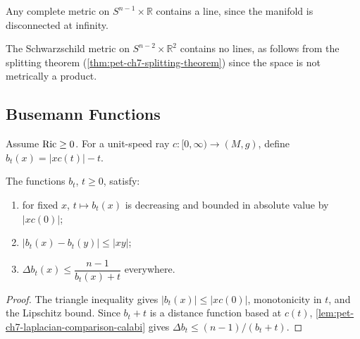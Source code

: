 \begin{example}
  \label{ex:pet-ch7-cylinder-contains-line}

  Any complete metric on $S^{n-1}\times\mathbb{R}$ contains a line, since the
  manifold is disconnected at infinity.
\end{example}

\begin{example}
  \label{ex:pet-ch7-schwarzschild-no-line}

  The Schwarzschild metric on $S^{n-2}\times\mathbb{R}^2$ contains no lines, as
  follows from the splitting theorem (\cref{thm:pet-ch7-splitting-theorem})
  since the space is not metrically a product.
\end{example}

\subsection{Busemann Functions}

Assume $\operatorname{Ric}\ge0$. For a unit-speed ray $c:[0,\infty)\to(M,g)$, define
$b_t(x)=|xc(t)|-t$.

\begin{proposition}
  \label{prop:pet-ch7-busemann-approximants}

  The functions $b_t$, $t\ge0$, satisfy:
  \begin{enumerate}
    \item[(1)] for fixed $x$, $t\mapsto b_t(x)$ is decreasing and bounded in
      absolute value by $|xc(0)|$;
    \item[(2)] $|b_t(x)-b_t(y)|\le|xy|$;
    \item[(3)] $\Delta b_t(x)\le\dfrac{n-1}{b_t(x)+t}$ everywhere.
  \end{enumerate}
\end{proposition}
\begin{proof}
  \sketch
  The triangle inequality gives \(|b_t(x)|\le|xc(0)|\), monotonicity in \(t\), and the Lipschitz bound. Since \(b_t+t\) is a distance function based at \(c(t)\), \cref{lem:pet-ch7-laplacian-comparison-calabi} gives \(\Delta b_t\le(n-1)/(b_t+t)\).
\end{proof}


